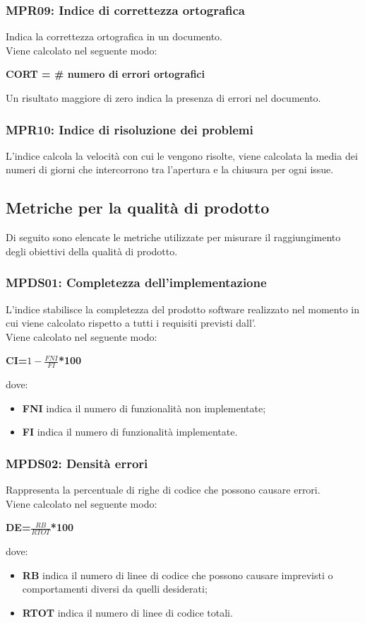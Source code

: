 \subsubsection{MPR09: Indice di correttezza ortografica}
Indica la correttezza ortografica in un documento.\\
Viene calcolato nel seguente modo:
\begin{center}
	\textbf{CORT = \# numero di errori ortografici}
\end{center}
Un risultato maggiore di zero indica la presenza di errori nel documento.
\subsubsection{MPR10: Indice di risoluzione dei problemi}
L'indice calcola la velocità con cui le  vengono risolte, viene calcolata la media dei numeri di giorni che intercorrono tra l'apertura e la chiusura per ogni issue.

\subsection{Metriche per la qualità di prodotto}
Di seguito sono elencate le metriche utilizzate per misurare il raggiungimento degli obiettivi della qualità di prodotto.
\subsubsection{MPDS01: Completezza dell'implementazione}
L'indice stabilisce la completezza del prodotto software realizzato nel momento in cui viene calcolato rispetto a tutti i requisiti previsti dall'.\\
Viene calcolato nel seguente modo:
\begin{center}
	\textbf{CI=\(1-\frac{FNI}{FI}\)*100}
\end{center}
dove:
\begin{itemize}
	\item \textbf{FNI} indica il numero di funzionalità non implementate;
	\item \textbf{FI} indica il numero di funzionalità implementate.
\end{itemize}
\subsubsection{MPDS02: Densità errori}
Rappresenta la percentuale di righe di codice che possono causare errori.\\
Viene calcolato nel seguente modo:
\begin{center}
	\textbf{DE=\(\frac{RB}{RTOT}\)*100}
\end{center}
dove:
\begin{itemize}
	\item \textbf{RB} indica il numero di linee di codice che possono causare imprevisti o comportamenti diversi da quelli desiderati;
	\item \textbf{RTOT} indica il numero di linee di codice totali.
\end{itemize}
